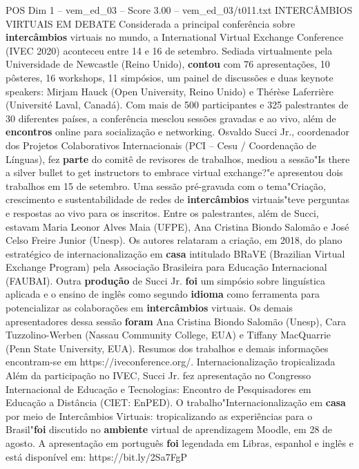 \begin{textsample}{POS Dim 1 – vem\_ed\_03 – Score 3.00 – vem\_ed\_03/t011.txt}  \label{ex:f1_pos_160}
INTERCÂMBIOS VIRTUAIS EM DEBATE Considerada a principal conferência sobre \textbf{intercâmbios} virtuais no mundo, a International Virtual Exchange Conference (IVEC 2020) aconteceu entre 14 e 16 de setembro.
Sediada virtualmente pela Universidade de Newcastle (Reino Unido), \textbf{contou} com 76 apresentações, 10 pôsteres, 16 workshops, 11 simpósios, um painel de discussões e duas keynote speakers: Mirjam Hauck (Open University, Reino Unido) e Thérèse Laferrière (Université Laval, Canadá).
Com mais de 500 participantes e 325 palestrantes de 30 diferentes países, a conferência mesclou sessões gravadas e ao vivo, além de \textbf{encontros} online para socialização e networking.
Osvaldo Succi Jr., coordenador dos Projetos Colaborativos Internacionais (PCI – Cesu / Coordenação de Línguas), fez \textbf{parte} do comitê de revisores de trabalhos, mediou a sessão"Is there a silver bullet to get instructors to embrace virtual exchange?"e apresentou dois trabalhos em 15 de setembro.
Uma sessão pré-gravada com o tema"Criação, crescimento e sustentabilidade de redes de \textbf{intercâmbios} virtuais"teve perguntas e respostas ao vivo para os inscritos.
Entre os palestrantes, além de Succi, estavam Maria Leonor Alves Maia (UFPE), Ana Cristina Biondo Salomão e José Celso Freire Junior (Unesp).
Os autores relataram a criação, em 2018, do plano estratégico de internacionalização em \textbf{casa} intitulado BRaVE (Brazilian Virtual Exchange Program) pela Associação Brasileira para Educação Internacional (FAUBAI).
Outra \textbf{produção} de Succi Jr. \textbf{foi} um simpósio sobre linguística aplicada e o ensino de inglês como segundo \textbf{idioma} como ferramenta para potencializar as colaborações em \textbf{intercâmbios} virtuais.
Os demais apresentadores dessa sessão \textbf{foram} Ana Cristina Biondo Salomão (Unesp), Cara Tuzzolino-Werben (Nassau Community College, EUA) e Tiffany MacQuarrie (Penn State University, EUA).
Resumos dos trabalhos e demais informações encontram-se em https://iveconference.org/.
Internacionalização tropicalizada Além da participação no IVEC, Succi Jr. fez apresentação no Congresso Internacional de Educação e Tecnologias: Encontro de Pesquisadores em Educação a Distância (CIET: EnPED).
O trabalho"Internacionalização em \textbf{casa} por meio de Intercâmbios Virtuais: tropicalizando as experiências para o Brasil"\textbf{foi} discutido no \textbf{ambiente} virtual de aprendizagem Moodle, em 28 de agosto.
A apresentação em português \textbf{foi} legendada em Libras, espanhol e inglês e está disponível em: https://bit.ly/2Sa7FgP

\end{textsample}
